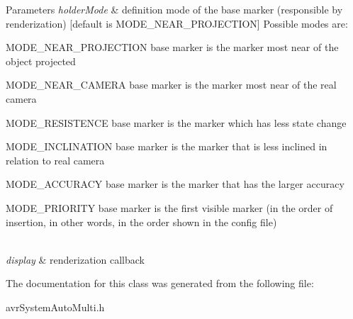 \begin{DoxyParams}{Parameters}
{\em holder\-Mode} & definition mode of the base marker (responsible by renderization) \mbox{[}default is M\-O\-D\-E\-\_\-\-N\-E\-A\-R\-\_\-\-P\-R\-O\-J\-E\-C\-T\-I\-O\-N\mbox{]} Possible modes are\-:\par
 \begin{DoxyItemize}
\item M\-O\-D\-E\-\_\-\-N\-E\-A\-R\-\_\-\-P\-R\-O\-J\-E\-C\-T\-I\-O\-N base marker is the marker most near of the object projected\par
 \item M\-O\-D\-E\-\_\-\-N\-E\-A\-R\-\_\-\-C\-A\-M\-E\-R\-A base marker is the marker most near of the real camera\par
 \item M\-O\-D\-E\-\_\-\-R\-E\-S\-I\-S\-T\-E\-N\-C\-E base marker is the marker which has less state change\par
 \item M\-O\-D\-E\-\_\-\-I\-N\-C\-L\-I\-N\-A\-T\-I\-O\-N base marker is the marker that is less inclined in relation to real camera\par
 \item M\-O\-D\-E\-\_\-\-A\-C\-C\-U\-R\-A\-C\-Y base marker is the marker that has the larger accuracy\par
 \item M\-O\-D\-E\-\_\-\-P\-R\-I\-O\-R\-I\-T\-Y base marker is the first visible marker (in the order of insertion, in other words, in the order shown in the config file) \end{DoxyItemize}
\\
\hline
{\em display} & renderization callback \\
\hline
\end{DoxyParams}


The documentation for this class was generated from the following file\-:\begin{DoxyCompactItemize}
\item 
avr\-System\-Auto\-Multi.\-h\end{DoxyCompactItemize}
